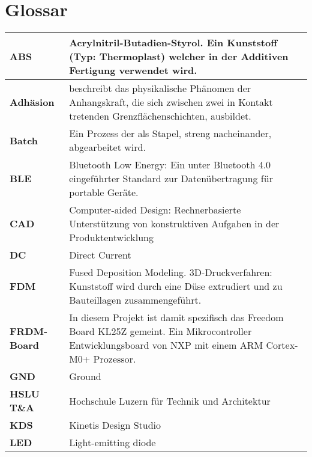 \newpage
\section*{Glossar}\label{dok:glossar}
\begin{table}[H]
	\begin{tabular}{|L{2.9cm}|L{12.6cm}|}
		\hline	
		\textbf{ABS} & Acrylnitril-Butadien-Styrol. Ein Kunststoff (Typ: Thermoplast) welcher in der Additiven Fertigung verwendet wird.\\
		
		\hline
		\textbf{Adhäsion} & beschreibt das physikalische Phänomen der Anhangskraft, die sich zwischen zwei in Kontakt tretenden Grenzflächenschichten, ausbildet. \\		

		\hline
		\textbf{Batch} & Ein Prozess der als Stapel, streng nacheinander, abgearbeitet wird.  \\

		\hline
		\textbf{BLE} & Bluetooth Low Energy: Ein unter Bluetooth 4.0 eingeführter Standard zur Datenübertragung für portable Geräte.\\

		\hline
		\textbf{CAD} & Computer-aided Design: Rechnerbasierte Unterstützung von konstruktiven Aufgaben in der Produktentwicklung \\

		\hline	
		\textbf{DC} & Direct Current\\

		\hline
		\textbf{FDM} & Fused Deposition Modeling. 3D-Druckverfahren: Kunststoff wird durch eine Düse extrudiert und zu Bauteillagen zusammengeführt.\\

		\hline		
		\textbf{FRDM-Board} & In diesem Projekt ist damit spezifisch das Freedom Board KL25Z gemeint. Ein Mikrocontroller Entwicklungsboard von NXP mit einem ARM Cortex-M0+ Prozessor. \\
		
		\hline
		\textbf{GND} & Ground\\
	
		\hline
		\textbf{HSLU T\&A} & Hochschule Luzern für Technik und Architektur\\ 
		
		\hline
		\textbf{KDS} & Kinetis Design Studio\\

		\hline
		\textbf{LED} & Light-emitting diode\\


\end{tabular}
\end{table}
